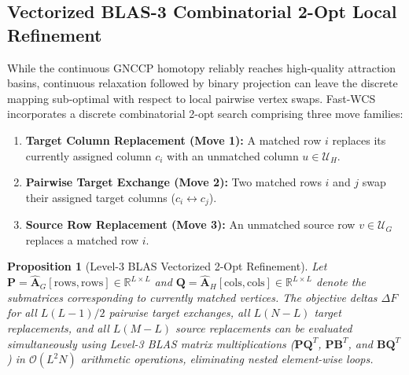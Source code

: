 \documentclass[conference]{IEEEtran}
\newtheorem{proposition}{Proposition}
\begin{document}
\subsection{Vectorized BLAS-3 Combinatorial 2-Opt Local Refinement}
\label{subsec:2opt}

While the continuous GNCCP homotopy reliably reaches high-quality attraction basins, continuous relaxation followed by binary projection can leave the discrete mapping sub-optimal with respect to local pairwise vertex swaps. Fast-WCS incorporates a discrete combinatorial 2-opt search comprising three move families:
\begin{enumerate}
    \item \textbf{Target Column Replacement (Move 1):} A matched row $i$ replaces its currently assigned column $c_i$ with an unmatched column $u \in \mathcal{U}_H$.
    \item \textbf{Pairwise Target Exchange (Move 2):} Two matched rows $i$ and $j$ swap their assigned target columns ($c_i \leftrightarrow c_j$).
    \item \textbf{Source Row Replacement (Move 3):} An unmatched source row $v \in \mathcal{U}_G$ replaces a matched row $i$.
\end{enumerate}

\begin{proposition}[Level-3 BLAS Vectorized 2-Opt Refinement]
\label{prop:2opt}
Let $\mathbf{P} = \hat{\mathbf{A}}_G[\mathrm{rows}, \mathrm{rows}] \in \mathbb{R}^{L \times L}$ and $\mathbf{Q} = \hat{\mathbf{A}}_H[\mathrm{cols}, \mathrm{cols}] \in \mathbb{R}^{L \times L}$ denote the submatrices corresponding to currently matched vertices. The objective deltas $\Delta F$ for all $L(L-1)/2$ pairwise target exchanges, all $L(N-L)$ target replacements, and all $L(M-L)$ source replacements can be evaluated simultaneously using Level-3 BLAS matrix multiplications ($\mathbf{P}\mathbf{Q}^T$, $\mathbf{P}\mathbf{B}^T$, and $\mathbf{B}\mathbf{Q}^T$) in $\mathcal{O}(L^2 N)$ arithmetic operations, eliminating nested element-wise loops.
\end{proposition}
\end{document}
